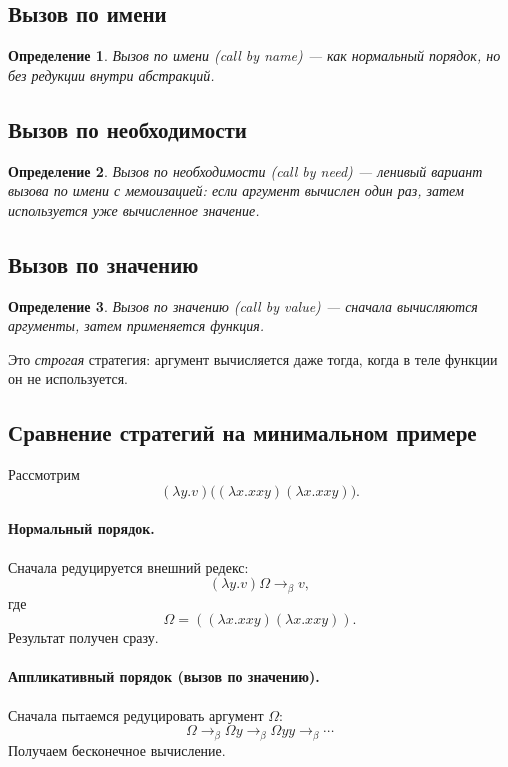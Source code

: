 \documentclass[12pt,a4paper]{article}
\newtheorem{definition}{Определение}
\theoremstyle{remark}
\begin{document}
\subsection{Вызов по имени}

\begin{definition}
\emph{Вызов по имени} (\emph{call by name}) --- как нормальный порядок, но без редукции внутри абстракций.
\end{definition}

\subsection{Вызов по необходимости}

\begin{definition}
\emph{Вызов по необходимости} (\emph{call by need}) --- ленивый вариант вызова по имени с мемоизацией: если аргумент вычислен один раз, затем используется уже вычисленное значение.
\end{definition}

\subsection{Вызов по значению}

\begin{definition}
\emph{Вызов по значению} (\emph{call by value}) --- сначала вычисляются аргументы, затем применяется функция.
\end{definition}

Это \emph{строгая} стратегия: аргумент вычисляется даже тогда, когда в теле функции он не используется.

\subsection{Сравнение стратегий на минимальном примере}

Рассмотрим
\[
(\lambda y.v)\big((\lambda x.xxy)(\lambda x.xxy)\big).
\]

\paragraph{Нормальный порядок.}
Сначала редуцируется внешний редекс:
\[
(\lambda y.v)\Omega \to_\beta v,
\]
где
\[
\Omega=((\lambda x.xxy)(\lambda x.xxy)).
\]
Результат получен сразу.

\paragraph{Аппликативный порядок (вызов по значению).}
Сначала пытаемся редуцировать аргумент $\Omega$:
\[
\Omega \to_\beta \Omega y \to_\beta \Omega yy \to_\beta \cdots
\]
Получаем бесконечное вычисление.
\end{document}

